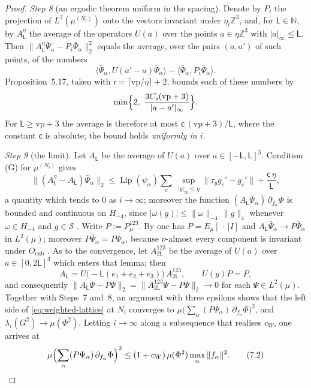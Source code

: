 \documentclass[11pt,letterpaper,reqno]{amsart}
\theoremstyle{definition}
\begin{document}
\begin{proof}
\emph{Step 8} (an ergodic theorem uniform in the spacing).
Denote by $P_i$ the projection of $L^2(\mu^{(N_i)})$ onto the vectors invariant under $\eta_i\mathbb Z^3$,
and, for $\mathsf L\in\mathbb N$, by $A^\eta_{\mathsf L}$ the average of the operators $U(a)$ over the points $a\in\eta\mathbb Z^3$ with $|a|_\infty\le\mathsf L$.
Then $\|A^\eta_{\mathsf L}\bar\Psi_\alpha-P_i\bar\Psi_\alpha\|_2^2$ equals the average, over the pairs $(a,a')$ of such points, of the numbers
\begin{equation*}
\langle\bar\Psi_\alpha,U(a'-a)\bar\Psi_\alpha\rangle-\langle\bar\Psi_\alpha,P_i\bar\Psi_\alpha\rangle.
\end{equation*}
Proposition~5.17, taken with $\mathsf r=\lceil\mathrm{vp}/\eta\rceil+2$, bounds each of these numbers by
\begin{equation*}
\min\Bigl\{2,\ \frac{3C_\flat(\mathrm{vp}+3)}{|a-a'|_\infty}\Bigr\}.
\end{equation*}
For $\mathsf L\ge\mathrm{vp}+3$ the average is therefore at most $\mathsf c\,(\mathrm{vp}+3)/\mathsf L$, where the constant $\mathsf c$ is absolute; the bound holds \emph{uniformly in $i$}.

\emph{Step 9} (the limit).
Let $A_{\mathsf L}$ be the average of $U(a)$ over $a\in[-\mathsf L,\mathsf L]^3$.
Condition (G) for $\mu^{(N_i)}$ gives
\begin{equation*}
\|(A^\eta_{\mathsf L}-A_{\mathsf L})\bar\Psi_\alpha\|_2\le\operatorname{Lip}(\psi_\alpha)\sum_c\ \sup_{|y|_\infty\le\eta}\|\tau_yg_c'-g_c'\|+\frac{\mathsf c\,\eta}{\mathsf L},
\end{equation*}
a quantity which tends to $0$ as $i\to\infty$;
moreover the function $(A_{\mathsf L}\bar\Psi_\alpha)\,\partial_{f_\alpha}\Phi$ is bounded and continuous on $H_{-4}$, since $|\omega(g)|\le\|\omega\|_{-4}\,\|g\|_4$ whenever $\omega\in H_{-4}$ and $g\in\mathcal S$ \cite[Section~12.5]{QEDII}.
Write $P:=P^{123}_\mu$.
By \cite[Lemma~8.13\,(iii), (iv)]{QEDI} one has $P=E_\mu[\,\cdot\,|I]$ and $A_{\mathsf L}\bar\Psi_\alpha\to P\bar\Psi_\alpha$ in $L^2(\mu)$;
moreover $P\bar\Psi_\alpha=P\Psi_\alpha$, because $\nu$-almost every component is invariant under $O_{\mathrm{cub}}$ \cite[Theorem~1.3\,(b)(v)]{QEDII}.
As to the convergence, let $A^{123}_{2\mathsf L}$ be the average of $U(a)$ over $a\in[0,2\mathsf L]^3$ which enters that lemma;
then
\begin{equation*}
A_{\mathsf L}=U\bigl(-\mathsf L(e_1+e_2+e_3)\bigr)\,A^{123}_{2\mathsf L},\qquad U(y)P=P,
\end{equation*}
and consequently $\|A_{\mathsf L}\Psi-P\Psi\|_2=\allowbreak \|A^{123}_{2\mathsf L}\Psi-P\Psi\|_2\to0$ for each $\Psi\in L^2(\mu)$.
Together with Steps~7 and~8, an argument with three epsilons shows that the left side of \eqref{eq:weighted-lattice} at $N_i$ converges to $\mu\bigl(\sum_\alpha(P\Psi_\alpha)\,\allowbreak \partial_{f_\alpha}\Phi\bigr)^2$, and $\lambda_i(G^2)\to\mu(\Phi^2)$.
Letting $i\to\infty$ along a subsequence that realises $c_W$, one arrives at
\begin{equation}
\mu\Bigl(\sum_\alpha(P\Psi_\alpha)\,\partial_{f_\alpha}\Phi\Bigr)^2\le(1+c_W)\,\mu(\Phi^2)\max_\alpha\|f_\alpha\|^2.
\tag{7.2}\label{eq:weighted-continuum}
\end{equation}


\end{proof}
\end{document}
